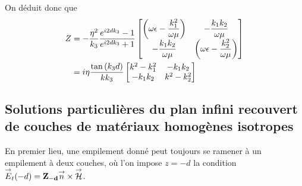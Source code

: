 On déduit donc que
\begin{align}
    Z &=  - \dfrac{\eta^2}{k_3}\dfrac{e^{i2dk_3} -1}{e^{i2dk_3} +1}  
        \begin{bmatrix}
           \left(\omega\epsilon-\dfrac{k_1^2}{\omega\mu}\right)  & -\dfrac{k_1k_2}{\omega\mu}\\
            -\dfrac{k_1k_2}{\omega\mu} &  \left(\omega\epsilon-\dfrac{k_2^2}{\omega\mu}\right)
        \end{bmatrix}\\
    &= i\eta\dfrac{\tan\left(k_3d\right)}{kk_3}
        \begin{bmatrix}
           k^2-k_1^2  & -k_1k_2\\
            -k_1k_2 & k^2-k_2^2\\
        \end{bmatrix}
\end{align}


\subsection{Solutions particulières du plan infini recouvert de couches de matériaux homogènes isotropes}

En premier lieu, une empilement donné peut toujours se ramener à un empilement à deux couches, où l'on impose $z=-d$ la condition ${\overset{\rightarrow}{E}}_t(-d) = \mathbf{Z_{-d}} {\overset{\rightarrow}{n}} \times {\overset{\rightarrow}{\mathcal{H}}}$.

